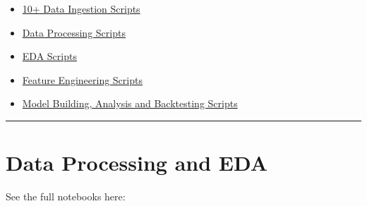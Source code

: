 \documentclass[
  a4paper,
  DIV=11,
  numbers=noendperiod]{scrreprt}
\providecommand{\tightlist}{%
  \setlength{\itemsep}{0pt}\setlength{\parskip}{0pt}}
\begin{document}
\begin{itemize}
\tightlist
\item
  \href{https://github.com/KetchupJL/solana-qrf-interval-forecasting/tree/main/notebooks/Data\%20Ingestion\%20Mini\%20Scripts}{10+
  Data Ingestion Scripts}
\item
  \href{https://github.com/KetchupJL/solana-qrf-interval-forecasting/tree/main/notebooks/Data\%20Processing}{Data
  Processing Scripts}
\item
  \href{https://github.com/KetchupJL/solana-qrf-interval-forecasting/tree/main/notebooks/EDA}{EDA
  Scripts}
\item
  \href{https://github.com/KetchupJL/solana-qrf-interval-forecasting/tree/main/notebooks/Feature\%20Engineering}{Feature
  Engineering Scripts}
\item
  \href{https://github.com/KetchupJL/solana-qrf-interval-forecasting/tree/main/notebooks/Model\%20Building}{Model
  Building, Analysis and Backtesting Scripts}
\end{itemize}

\begin{center}\rule{0.5\linewidth}{0.5pt}\end{center}

\section{Data Processing and EDA}\label{data-processing-and-eda-1}

See the full notebooks here:
\end{document}
